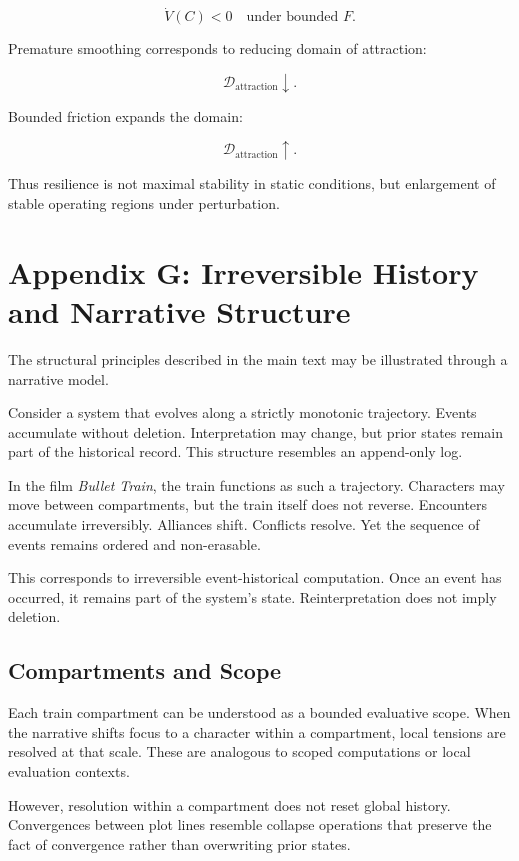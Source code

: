 \documentclass[12pt]{article}
\begin{document}
\[
\dot{V}(C) < 0 \quad \text{under bounded } F.
\]

Premature smoothing corresponds to reducing domain of attraction:

\[
\mathcal{D}_{\text{attraction}} \downarrow.
\]

Bounded friction expands the domain:

\[
\mathcal{D}_{\text{attraction}} \uparrow.
\]

Thus resilience is not maximal stability in static conditions,
but enlargement of stable operating regions under perturbation.

\section*{Appendix G: Irreversible History and Narrative Structure}

The structural principles described in the main text may be illustrated through a narrative model.

Consider a system that evolves along a strictly monotonic trajectory. Events accumulate without deletion. Interpretation may change, but prior states remain part of the historical record. This structure resembles an append-only log.

In the film \emph{Bullet Train}, the train functions as such a trajectory. Characters may move between compartments, but the train itself does not reverse. Encounters accumulate irreversibly. Alliances shift. Conflicts resolve. Yet the sequence of events remains ordered and non-erasable.

This corresponds to irreversible event-historical computation. Once an event has occurred, it remains part of the system's state. Reinterpretation does not imply deletion.

\subsection*{Compartments and Scope}

Each train compartment can be understood as a bounded evaluative scope. When the narrative shifts focus to a character within a compartment, local tensions are resolved at that scale. These are analogous to scoped computations or local evaluation contexts.

However, resolution within a compartment does not reset global history. Convergences between plot lines resemble collapse operations that preserve the fact of convergence rather than overwriting prior states.
\end{document}
